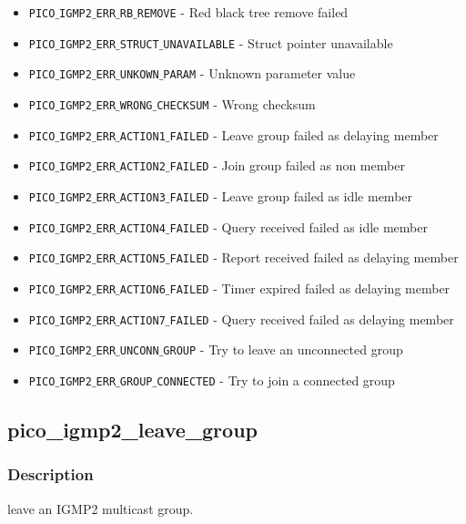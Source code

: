 \begin{itemize}[noitemsep]
\item \texttt{PICO$\_$IGMP2$\_$ERR$\_$RB$\_$REMOVE}          - Red black tree remove failed 
\item \texttt{PICO$\_$IGMP2$\_$ERR$\_$STRUCT$\_$UNAVAILABLE} - Struct pointer unavailable 
\item \texttt{PICO$\_$IGMP2$\_$ERR$\_$UNKOWN$\_$PARAM}       - Unknown parameter value 
\item \texttt{PICO$\_$IGMP2$\_$ERR$\_$WRONG$\_$CHECKSUM}     - Wrong checksum  
\item \texttt{PICO$\_$IGMP2$\_$ERR$\_$ACTION1$\_$FAILED}     - Leave group failed as delaying member
\item \texttt{PICO$\_$IGMP2$\_$ERR$\_$ACTION2$\_$FAILED}     - Join group failed as non member
\item \texttt{PICO$\_$IGMP2$\_$ERR$\_$ACTION3$\_$FAILED}     - Leave group failed as idle member 
\item \texttt{PICO$\_$IGMP2$\_$ERR$\_$ACTION4$\_$FAILED}     - Query received failed as idle member
\item \texttt{PICO$\_$IGMP2$\_$ERR$\_$ACTION5$\_$FAILED}     - Report received failed as delaying member
\item \texttt{PICO$\_$IGMP2$\_$ERR$\_$ACTION6$\_$FAILED}     - Timer expired failed as delaying member
\item \texttt{PICO$\_$IGMP2$\_$ERR$\_$ACTION7$\_$FAILED}     - Query received failed as delaying member
\item \texttt{PICO$\_$IGMP2$\_$ERR$\_$UNCONN$\_$GROUP}       - Try to leave an unconnected group
\item \texttt{PICO$\_$IGMP2$\_$ERR$\_$GROUP$\_$CONNECTED}    - Try to join a connected group 
\end{itemize}



\subsection{pico\_igmp2\_leave\_group}

\subsubsection*{Description}
leave an IGMP2 multicast group.

